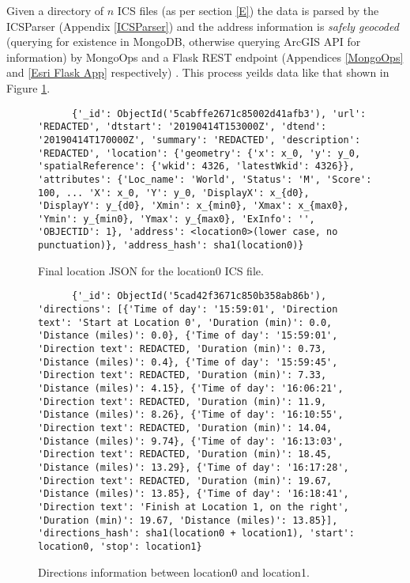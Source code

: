 \documentclass[letterpaper,11pt]{report}
\theoremstyle{definition}
\theoremstyle{definition}
\begin{document}
Given a directory of $n$ ICS files (as per section \ref{E}) the data is parsed by the ICSParser (Appendix \ref{ICSParser}) and the address information is \emph{safely geocoded} (querying for existence in MongoDB, otherwise querying ArcGIS API for information) by MongoOps and a Flask REST endpoint (Appendices \ref{MongoOps} and \ref{Esri Flask App} respectively) \cite{Flask}. This process yeilds data like that shown in Figure \ref{location0_data}.
\begin{figure}[!htb]
  \begin{center}
    \begin{lstlisting}
      {'_id': ObjectId('5cabffe2671c85002d41afb3'), 'url': 'REDACTED', 'dtstart': '20190414T153000Z', 'dtend': '20190414T170000Z', 'summary': 'REDACTED', 'description': 'REDACTED', 'location': {'geometry': {'x': x_0, 'y': y_0, 'spatialReference': {'wkid': 4326, 'latestWkid': 4326}}, 'attributes': {'Loc_name': 'World', 'Status': 'M', 'Score': 100, ... 'X': x_0, 'Y': y_0, 'DisplayX': x_{d0}, 'DisplayY': y_{d0}, 'Xmin': x_{min0}, 'Xmax': x_{max0}, 'Ymin': y_{min0}, 'Ymax': y_{max0}, 'ExInfo': '', 'OBJECTID': 1}, 'address': <location0>(lower case, no punctuation)}, 'address_hash': sha1(location0)}
    \end{lstlisting}
    \caption{Final location JSON for the location0 ICS file.}\label{location0_data}
  \end{center}
\end{figure}


\begin{figure}[!htb]
  \begin{center}
    \begin{lstlisting}
      {'_id': ObjectId('5cad42f3671c850b358ab86b'), 'directions': [{'Time of day': '15:59:01', 'Direction text': 'Start at Location 0', 'Duration (min)': 0.0, 'Distance (miles)': 0.0}, {'Time of day': '15:59:01', 'Direction text': REDACTED, 'Duration (min)': 0.73, 'Distance (miles)': 0.4}, {'Time of day': '15:59:45', 'Direction text': REDACTED, 'Duration (min)': 7.33, 'Distance (miles)': 4.15}, {'Time of day': '16:06:21', 'Direction text': REDACTED, 'Duration (min)': 11.9, 'Distance (miles)': 8.26}, {'Time of day': '16:10:55', 'Direction text': REDACTED, 'Duration (min)': 14.04, 'Distance (miles)': 9.74}, {'Time of day': '16:13:03', 'Direction text': REDACTED, 'Duration (min)': 18.45, 'Distance (miles)': 13.29}, {'Time of day': '16:17:28', 'Direction text': REDACTED, 'Duration (min)': 19.67, 'Distance (miles)': 13.85}, {'Time of day': '16:18:41', 'Direction text': 'Finish at Location 1, on the right', 'Duration (min)': 19.67, 'Distance (miles)': 13.85}], 'directions_hash': sha1(location0 + location1), 'start': location0, 'stop': location1}
    \end{lstlisting}
    \caption{Directions information between location0 and location1.}\label{location0_location1_directions}
  \end{center}
\end{figure}
\end{document}
